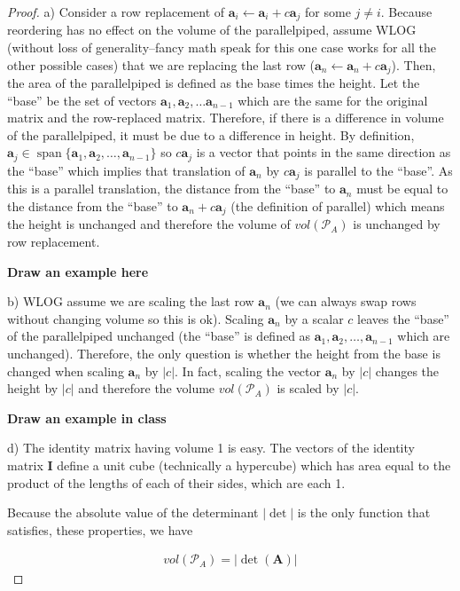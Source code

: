\documentclass[
]{book}
\theoremstyle{definition}
\theoremstyle{definition}
\theoremstyle{definition}
\theoremstyle{remark}
\begin{document}
\begin{proof}
a) Consider a row replacement of \(\mathbf{a}_i \leftarrow \mathbf{a}_i + c \mathbf{a}_j\) for some \(j \neq i\). Because reordering has no effect on the volume of the parallelpiped, assume WLOG (without loss of generality--fancy math speak for this one case works for all the other possible cases) that we are replacing the last row (\(\mathbf{a}_n \leftarrow \mathbf{a}_n + c \mathbf{a}_j\)). Then, the area of the parallelpiped is defined as the base times the height. Let the ``base'' be the set of vectors \(\mathbf{a}_1, \mathbf{a}_2, \ldots \mathbf{a}_{n-1}\) which are the same for the original matrix and the row-replaced matrix. Therefore, if there is a difference in volume of the parallelpiped, it must be due to a difference in height. By definition, \(\mathbf{a}_j \in \operatorname{span}\{\mathbf{a}_1, \mathbf{a}_2, \ldots, \mathbf{a}_{n-1}\}\) so \(c \mathbf{a}_j\) is a vector that points in the same direction as the ``base'' which implies that translation of \(\mathbf{a}_n\) by \(c \mathbf{a}_j\) is parallel to the ``base''. As this is a parallel translation, the distance from the ``base'' to \(\mathbf{a}_n\) must be equal to the distance from the ``base'' to \(\mathbf{a}_n + c \mathbf{a}_j\) (the definition of parallel) which means the height is unchanged and therefore the volume of \(vol(\mathcal{P}_A)\) is unchanged by row replacement.

\textbf{Draw an example here}

b) WLOG assume we are scaling the last row \(\mathbf{a}_n\) (we can always swap rows without changing volume so this is ok). Scaling \(\mathbf{a}_n\) by a scalar \(c\) leaves the ``base'' of the parallelpiped unchanged (the ``base'' is defined as \(\mathbf{a}_1, \mathbf{a}_2, \ldots, \mathbf{a}_{n-1}\) which are unchanged). Therefore, the only question is whether the height from the base is changed when scaling \(\mathbf{a}_n\) by \(|c|\). In fact, scaling the vector \(\mathbf{a}_n\) by \(|c|\) changes the height by \(|c|\) and therefore the volume \(vol(\mathcal{P}_A)\) is scaled by \(|c|\).

\textbf{Draw an example in class}

d) The identity matrix having volume 1 is easy. The vectors of the identity matrix \(\mathbf{I}\) define a unit cube (technically a hypercube) which has area equal to the product of the lengths of each of their sides, which are each 1.

Because the absolute value of the determinant \(|\det|\) is the only function that satisfies, these properties, we have

\[
\begin{aligned}
vol(\mathcal{P}_A) = |\det(\mathbf{A})|
\end{aligned}
\]

\end{proof}
\end{document}
